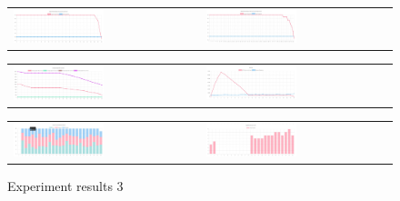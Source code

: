 \begin{figure}[htbp]
\begin{tabular}{ll}
    \centering
    \includegraphics[width=0.5\textwidth]{007_team_4_agent_design/figures/EX3_1.jpg}
    &
    \includegraphics[width=0.5\textwidth]{007_team_4_agent_design/figures/EX3_2.jpg}
\end{tabular}

\end{figure}

\begin{figure}[htbp]
\begin{tabular}{ll}
    \centering
    \includegraphics[width=0.5\textwidth]{007_team_4_agent_design/figures/EX3_3.jpg}
    &
    \includegraphics[width=0.5\textwidth]{007_team_4_agent_design/figures/EX3_4.jpg}
\end{tabular}

\end{figure}


\begin{figure}[htbp]
\begin{tabular}{ll}
    \centering
    \includegraphics[width=0.5\textwidth]{007_team_4_agent_design/figures/EX3_5.jpg}
    &
    \includegraphics[width=0.5\textwidth]{007_team_4_agent_design/figures/EX3_6.jpg}
\end{tabular}
    \caption{Experiment results 3}
\end{figure}

